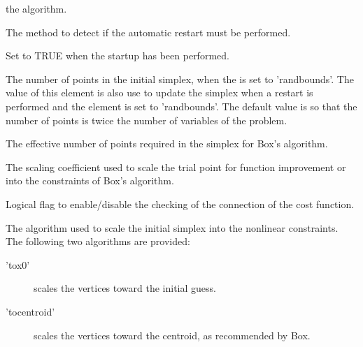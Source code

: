 \begin{Arguments}
\begin{ldescription}
the algorithm.
\item[\code{restartdetection}] The method to detect if the automatic restart must
be performed.
\item[\code{startupflag}] Set to TRUE when the startup has been performed.
\item[\code{boxnbpoints}] The number of points in the initial simplex, when the
 is set to 'randbounds'. The value of this element is
also use to update the simplex when a restart is performed and the
 element is set to 'randbounds'. The default
value is so that the number of points is twice the number of variables of
the problem.
\item[\code{boxnbpointseff}] The effective number of points required in the simplex
for Box's algorithm.
\item[\code{boxineqscaling}] The scaling coefficient used to scale the trial point
for function improvement or into the constraints of Box's algorithm.
\item[\code{checkcostfunction}] Logical flag to enable/disable the checking of the
connection of the cost function.
\item[\code{scalingsimplex0}] The algorithm used to scale the initial simplex into
the nonlinear constraints. The following two algorithms are provided:
\begin{description}

\item['tox0'] scales the vertices toward the initial guess.
\item['tocentroid'] scales the vertices toward the centroid, as
recommended by Box.

\end{description}


\end{ldescription}
\end{Arguments}
